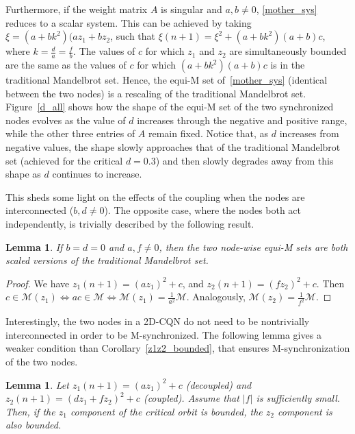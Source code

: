 \documentclass[10pt]{article}
\newtheorem{lemma}[thm]{Lemma}
\begin{document}
Furthermore, if the weight matrix $A$ is singular and $a,b \neq 0$, \eqref{mother_sys} reduces to a scalar system. This can be achieved by taking $\xi = (a+b k^2)(a z_1 + b z_2$, such that $\xi(n + 1) = \xi^2+(a + b k^2) (a + b) c$, where $k = \frac{d}{a} = \frac{f}{b}$. The values of $c$ for which $z_1$ and $z_2$ are simultaneously bounded are the same as the values of $c$ for which $(a + b k^2) (a + b) c$ is in the traditional Mandelbrot set. Hence, the equi-M set of~\eqref{mother_sys} (identical between the two nodes) is a rescaling of the traditional Mandelbrot set. Figure~\ref{d_all} shows how the shape of the equi-M set of the two synchronized nodes evolves as the value of $d$ increases through the negative and positive range, while the other three entries of $A$ remain fixed. Notice that, as $d$ increases from negative values, the shape slowly approaches that of the traditional Mandelbrot set (achieved for the critical $d = 0.3$) and then slowly degrades away from this shape as $d$ continues to increase.

This sheds some light on the effects of the coupling when the nodes are interconnected ($b, d \neq 0$). The opposite case, where the nodes both act independently, is
trivially described by the following result.

\begin{lemma}
If $b = d = 0$ and $a, f \neq 0$, then the two node-wise equi-M sets are both scaled versions of the traditional Mandelbrot set.
\end{lemma}

\begin{proof}
We have $z_1(n+1) = (az_1)^2+c$, and $z_2(n+1) = (fz_2)^2+c$. Then $c \in \mathcal{M}(z_1) \iff ac \in \mathcal{M} \iff \mathcal{M}(z_1) = \frac{1}{a^2}\mathcal{M}$. Analogously, $\mathcal{M}(z_2) = \frac{1}{f^2}\mathcal{M}$.
\end{proof}

Interestingly, the two nodes in a 2D-CQN do not need to be nontrivially interconnected in order to be M-synchronized. The following lemma gives a weaker condition than Corollary~\ref{z1z2_bounded}, that ensures M-synchronization of the two nodes.

\begin{lemma} \label{weak_f}
Let $z_1(n + 1) = (a z_1)^2 + c$ (decoupled) and $z_2(n + 1)=(d z_1 + f z_2)^2 + c$ (coupled). Assume that $|f|$ is sufficiently small. Then, if the $z_1$ component of the critical orbit is bounded, the $z_2$ component is also bounded.
\end{lemma}
\end{document}

